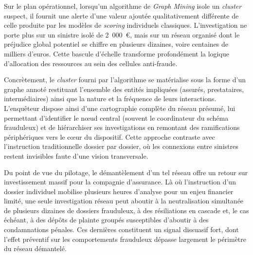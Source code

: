 Sur le plan opérationnel, lorsqu'un algorithme de \textit{Graph Mining} isole un \textit{cluster} suspect, il fournit une alerte d'une valeur ajoutée qualitativement différente de celle produite par les modèles de \textit{scoring} individuels classiques. L'investigation ne porte plus sur un sinistre isolé de 2~000~\euro{}, mais sur un réseau organisé dont le préjudice global potentiel se chiffre en plusieurs dizaines, voire centaines de milliers d'euros. Cette bascule d'échelle transforme profondément la logique d'allocation des ressources au sein des cellules anti-fraude.

Concrètement, le \textit{cluster} fourni par l'algorithme se matérialise sous la forme d'un graphe annoté restituant l'ensemble des entités impliquées (assurés, prestataires, intermédiaires) ainsi que la nature et la fréquence de leurs interactions. L'enquêteur dispose ainsi d'une cartographie complète du réseau présumé, lui permettant d'identifier le nœud central (souvent le coordinateur du schéma frauduleux) et de hiérarchiser ses investigations en remontant des ramifications périphériques vers le cœur du dispositif. Cette approche contraste avec l'instruction traditionnelle dossier par dossier, où les connexions entre sinistres restent invisibles faute d'une vision transversale.

Du point de vue du pilotage, le démantèlement d'un tel réseau offre un retour sur investissement massif pour la compagnie d'assurance. Là où l'instruction d'un dossier individuel mobilise plusieurs heures d'analyse pour un enjeu financier limité, une seule investigation réseau peut aboutir à la neutralisation simultanée de plusieurs dizaines de dossiers frauduleux, à des résiliations en cascade et, le cas échéant, à des dépôts de plainte groupés susceptibles d'aboutir à des condamnations pénales. Ces dernières constituent un signal dissuasif fort, dont l'effet préventif sur les comportements frauduleux dépasse largement le périmètre du réseau démantelé.

